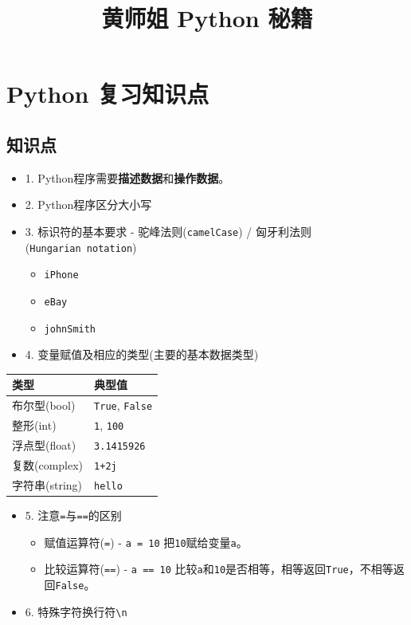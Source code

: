 \documentclass[11pt]{article}
\title{黄师姐 Python 秘籍}
\providecommand{\tightlist}{%
      \setlength{\itemsep}{0pt}\setlength{\parskip}{0pt}}
\begin{document}
    
    \maketitle
    
    

    
    \hypertarget{python-ux590dux4e60ux77e5ux8bc6ux70b9}{%
\section{Python
复习知识点}\label{python-ux590dux4e60ux77e5ux8bc6ux70b9}}

\hypertarget{ux77e5ux8bc6ux70b9}{%
\subsection{知识点}\label{ux77e5ux8bc6ux70b9}}

\begin{itemize}
\tightlist
\item
  1. Python程序需要\textbf{描述数据}和\textbf{操作数据}。
\item
  2. Python程序区分大小写
\item
  3. 标识符的基本要求 - 驼峰法则(\texttt{camelCase}) /
  匈牙利法则(\texttt{Hungarian\ notation})

  \begin{itemize}
  \tightlist
  \item
    \texttt{iPhone}
  \item
    \texttt{eBay}
  \item
    \texttt{johnSmith}
  \end{itemize}
\item
  4. 变量赋值及相应的类型(主要的基本数据类型)
\end{itemize}

    \begin{longtable}[]{@{}ll@{}}
\toprule
类型 & 典型值 \\
\midrule
\endhead
布尔型(bool) & \texttt{True}, \texttt{False} \\
整形(int) & \texttt{1}, \texttt{100} \\
浮点型(float) & \texttt{3.1415926} \\
复数(complex) & \texttt{1+2j} \\
字符串(string) & \texttt{\textquotesingle{}hello\textquotesingle{}} \\
\bottomrule
\end{longtable}

    \begin{itemize}
\tightlist
\item
  5. 注意\texttt{=}与\texttt{==}的区别

  \begin{itemize}
  \tightlist
  \item
    赋值运算符(\texttt{=}) - \texttt{a\ =\ 10}
    把\texttt{10}赋给变量\texttt{a}。
  \item
    比较运算符(\texttt{==}) - \texttt{a\ ==\ 10}
    比较\texttt{a}和\texttt{10}是否相等，相等返回\texttt{True}，不相等返回\texttt{False}。
  \end{itemize}
\item
  6. 特殊字符换行符\texttt{\textbackslash{}n}
\end{itemize}
\end{document}
